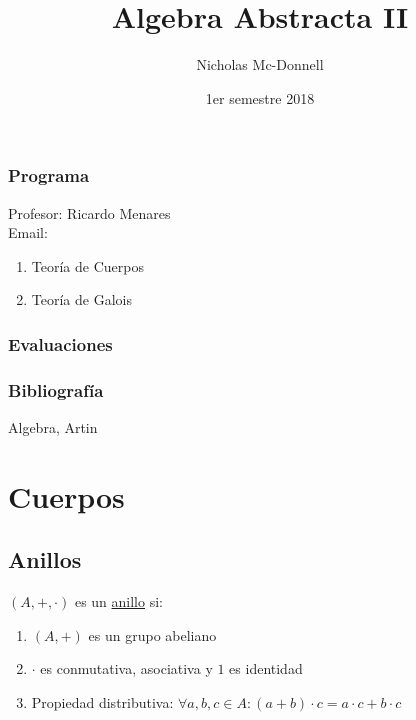 

\title{Algebra Abstracta II}
\author{Nicholas Mc-Donnell}
\date{1er semestre 2018}



    \maketitle

    \section*{Programa}
    {\raggedleft Profesor: Ricardo Menares}\\
    Email: 
    \begin{enumerate}
        \item Teoría de Cuerpos

        \item Teoría de Galois
    \end{enumerate}

    \section*{Evaluaciones}

    \section*{Bibliografía}
    Algebra, Artin

    \newpage

    \tableofcontents

    \part{Cuerpos}
    \chapter{Anillos}
    \begin{defn}[Anillo]
        $(A,+,\cdot)$ es un \underline{anillo} si:
        \begin{enumerate}
            \item $(A,+)$ es un grupo abeliano

            \item $\cdot$ es conmutativa, asociativa y $1$ es identidad

            \item Propiedad distributiva: $\forall a,b,c\in A: (a+b)\cdot c=a\cdot c+ b\cdot c$
        \end{enumerate}
    \end{defn}

